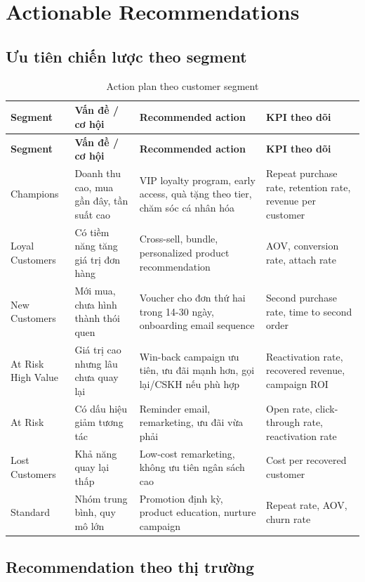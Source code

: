 \documentclass[11pt,a4paper]{article}
\begin{document}
\section{Actionable Recommendations}

\subsection{Ưu tiên chiến lược theo segment}

\begin{longtable}{p{3.2cm}p{3.2cm}p{4.8cm}p{3.8cm}}
\caption{Action plan theo customer segment}\\
\toprule
\textbf{Segment} & \textbf{Vấn đề / cơ hội} & \textbf{Recommended action} & \textbf{KPI theo dõi} \\
\midrule
\endfirsthead
\toprule
\textbf{Segment} & \textbf{Vấn đề / cơ hội} & \textbf{Recommended action} & \textbf{KPI theo dõi} \\
\midrule
\endhead
Champions & Doanh thu cao, mua gần đây, tần suất cao & VIP loyalty program, early access, quà tặng theo tier, chăm sóc cá nhân hóa & Repeat purchase rate, retention rate, revenue per customer \\
Loyal Customers & Có tiềm năng tăng giá trị đơn hàng & Cross-sell, bundle, personalized product recommendation & AOV, conversion rate, attach rate \\
New Customers & Mới mua, chưa hình thành thói quen & Voucher cho đơn thứ hai trong 14-30 ngày, onboarding email sequence & Second purchase rate, time to second order \\
At Risk High Value & Giá trị cao nhưng lâu chưa quay lại & Win-back campaign ưu tiên, ưu đãi mạnh hơn, gọi lại/CSKH nếu phù hợp & Reactivation rate, recovered revenue, campaign ROI \\
At Risk & Có dấu hiệu giảm tương tác & Reminder email, remarketing, ưu đãi vừa phải & Open rate, click-through rate, reactivation rate \\
Lost Customers & Khả năng quay lại thấp & Low-cost remarketing, không ưu tiên ngân sách cao & Cost per recovered customer \\
Standard & Nhóm trung bình, quy mô lớn & Promotion định kỳ, product education, nurture campaign & Repeat rate, AOV, churn rate \\
\bottomrule
\end{longtable}

\subsection{Recommendation theo thị trường}
\end{document}
